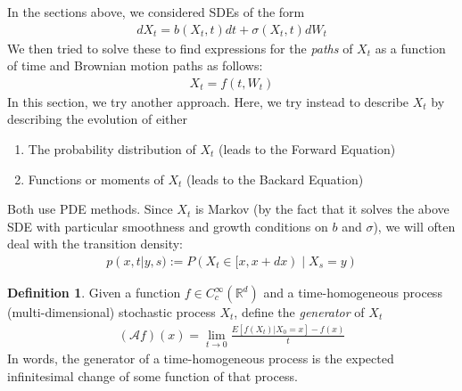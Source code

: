 \documentclass[12pt]{article}
\theoremstyle{plain}
\theoremstyle{definition}
\newtheorem{defn}[thm]{Definition}
\theoremstyle{remark}
\begin{document}
In the sections above, we considered SDEs of the form
\begin{align*}
  dX_t = b(X_t,t) dt + \sigma(X_t,t) dW_t
\end{align*}
We then tried to solve these to find expressions for the \emph{paths} of $X_t$ as a function of time and Brownian motion paths as follows:
\begin{align*}
  X_t = f(t,W_t)
\end{align*}
In this section, we try another approach. Here, we try instead to
describe $X_t$ by describing the evolution of either
\begin{enumerate}
  \item The probability distribution of $X_t$ (leads to the Forward
    Equation)
  \item Functions or moments of $X_t$ (leads to the Backard Equation)
\end{enumerate}
Both use PDE methods. Since $X_t$ is Markov (by the fact that it solves
the above SDE with particular smoothness and growth conditions on $b$
and $\sigma$), we will often deal with the transition density:
\begin{align*}
  p(x,t|y,s) := P(X_t\in [x,x+dx) \; | \; X_s=y)
\end{align*}

\begin{defn}
Given a function $f\in C_c^\infty(\mathbb{R}^d)$ and a time-homogeneous
process (multi-dimensional) stochastic process $X_t$, define the
\emph{generator} of $X_t$
\begin{align}
  (\mathscr{A}f)(x)=
  \lim_{t\rightarrow0} \frac{E[f(X_t)|X_0=x]-f(x)}{t}
  \label{genA}
\end{align}
In words, the generator of a time-homogeneous process is the
expected infinitesimal change of some function of that process.
\end{defn}
\end{document}
